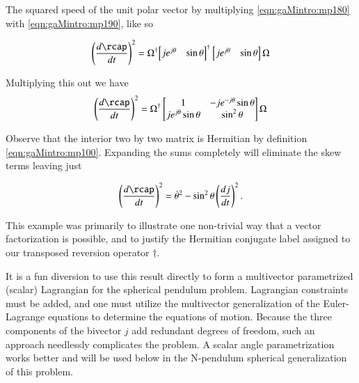 The squared speed of the unit polar vector by multiplying \ref{eqn:gaMintro:mp180} with \ref{eqn:gaMintro:mp190}, like so

\begin{align}\label{eqn:gaMintro:mp200}
\left( \frac{d\rcap}{dt} \right)^2 =
\Omega^\dagger
{\begin{bmatrix}
j e^{j \theta} & \sin\theta
\end{bmatrix}}^\dagger
\begin{bmatrix}
j e^{j \theta} & \sin\theta
\end{bmatrix}
\Omega
\end{align}

Multiplying this out we have
\begin{align}\label{eqn:gaMintro:mp210}
\left( \frac{d\rcap}{dt} \right)^2 =
\Omega^\dagger
\begin{bmatrix}
1 & -j e^{-j\theta}\sin\theta \\
j e^{j\theta}\sin\theta  & \sin^2\theta
\end{bmatrix}
\Omega
\end{align}

Observe that the interior two by two matrix is Hermitian by definition \ref{eqn:gaMintro:mp100}.  Expanding the sums completely will eliminate the skew terms leaving just

\begin{align}\label{eqn:gaMintro:mp220}
\left( \frac{d\rcap}{dt} \right)^2 =
\dot{\theta}^2 - \sin^2 \theta \left(\frac{dj}{dt}\right)^2.
\end{align}

This example was primarily to illustrate one non-trivial way that a vector factorization is possible, and to justify the Hermitian conjugate label assigned to our transposed reversion operator $\dagger$.

It is a fun diversion to use this result directly to form a multivector parametrized (scalar) Lagrangian for the spherical pendulum problem.  Lagrangian constraints must be added, and one must utilize the multivector generalization of the Euler-Lagrange equations to determine the equations of motion.  Because the three components of the bivector $j$ add redundant degrees of freedom, such an approach needlessly complicates the problem.  A scalar angle parametrization works better and will be used below in the N-pendulum spherical generalization of this problem.

\EndArticle
